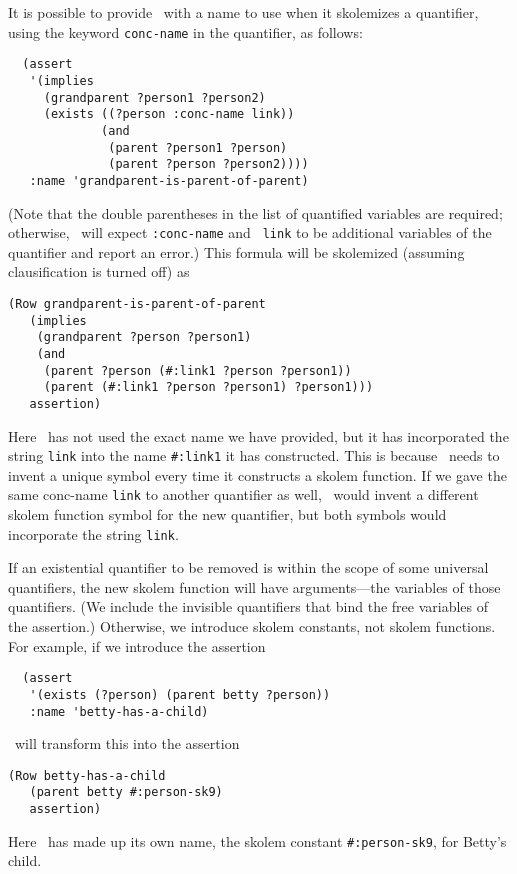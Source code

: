 It is possible to provide \snark\  with a name to use when it
skolemizes a quantifier, using the keyword {\tt conc-name} in the
quantifier, as follows:
\begin{verbatim}
  (assert
   '(implies
     (grandparent ?person1 ?person2)
     (exists ((?person :conc-name link))
             (and
              (parent ?person1 ?person)
              (parent ?person ?person2))))
   :name 'grandparent-is-parent-of-parent)
\end{verbatim}
(Note that the double parentheses in the list of quantified variables
are required; otherwise, \snark\  will expect {\tt :conc-name} and {\tt
link} to be additional variables of the quantifier and report an
error.)  This formula will be skolemized (assuming clausification is
turned off) as
\begin{verbatim}
(Row grandparent-is-parent-of-parent
   (implies
    (grandparent ?person ?person1)
    (and
     (parent ?person (#:link1 ?person ?person1))
     (parent (#:link1 ?person ?person1) ?person1)))
   assertion)
\end{verbatim}
Here \snark\  has not used the exact name we have provided, but it has
 incorporated the string {\tt link} into the name
\verb'#:link1' it has constructed.
 This is because \snark\  needs to invent a unique symbol every time it
 constructs a skolem function.
 If we gave the same conc-name {\tt link} to another quantifier as
 well, \snark\  would invent a different skolem function symbol for the new
 quantifier, but both symbols would incorporate the string {\tt link}.

If an existential quantifier to be removed is within the scope of some
 universal quantifiers, the new skolem function will have arguments---the
 variables of those quantifiers.  (We include the invisible quantifiers that
 bind the free variables of the assertion.)  Otherwise, we introduce skolem
 constants, not skolem functions.  For example, if we introduce the assertion
\begin{verbatim}
  (assert
   '(exists (?person) (parent betty ?person))
   :name 'betty-has-a-child)
\end{verbatim}
\snark\  will transform this into the assertion
\begin{verbatim}
(Row betty-has-a-child
   (parent betty #:person-sk9)
   assertion)
\end{verbatim}
Here \snark\  has made up its own name, the skolem constant
 \verb|#:person-sk9|, for Betty's child.


